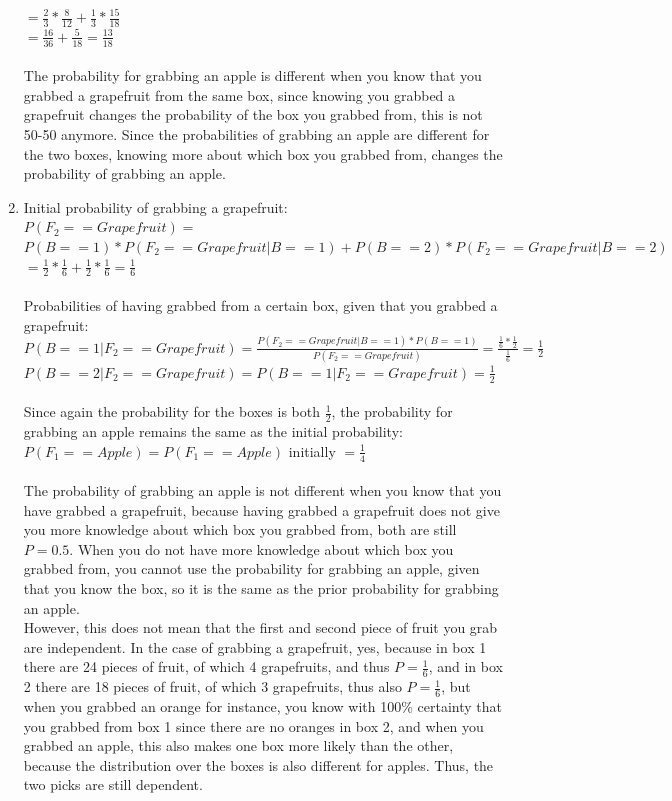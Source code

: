 \documentclass[a4paper,11pt]{article}
\theoremstyle{mytheor}
\begin{document}
\begin{enumerate}
$= \frac{2}{3} * \frac{8}{12} + \frac{1}{3} * \frac{15}{18}$ \\
$= \frac{16}{36} + \frac{5}{18} = \frac{13}{18}$\\
\\
The probability for grabbing an apple is different when you know that you grabbed a grapefruit from the same box, since knowing you grabbed a grapefruit changes the probability of the box you grabbed from, this is not 50-50 anymore. Since the probabilities of grabbing an apple are different for the two boxes, knowing more about which box you grabbed from, changes the probability of grabbing an apple.

\item Initial probability of grabbing a grapefruit:\\
$P(F_2 == Grapefruit) = $\\
$P(B == 1) * P(F_2 == Grapefruit | B == 1) + P(B == 2) * P(F_2 == Grapefruit | B == 2)$ \\
$= \frac{1}{2} * \frac{1}{6} + \frac{1}{2} * \frac{1}{6} = \frac{1}{6}$\\
\\
Probabilities of having grabbed from a certain box, given that you grabbed a grapefruit:\\
$P(B == 1 | F_2 == Grapefruit) = \frac{P(F_2 == Grapefruit | B == 1) * P(B == 1)}{P(F_2 == Grapefruit)} = \frac{\frac{1}{6} * \frac{1}{2}}{\frac{1}{6}} = \frac{1}{2}$\\
$P(B == 2 | F_2 == Grapefruit) = P(B == 1 | F_2 == Grapefruit) = \frac{1}{2}$\\
\\
Since again the probability for the boxes is both $\frac{1}{2}$, the probability for grabbing an apple remains the same as the initial probability:\\
$P(F_1 == Apple) = P(F_1 == Apple)$ initially $= \frac{1}{4}$\\
\\
The probability of grabbing an apple is not different when you know that you have grabbed a grapefruit, because having grabbed a grapefruit does not give you more knowledge about which box you grabbed from, both are still $P = 0.5$. When you do not have more knowledge about which box you grabbed from, you cannot use the probability for grabbing an apple, given that you know the box, so it is the same as the prior probability for grabbing an apple.\\
However, this does not mean that the first and second piece of fruit you grab are independent. In the case of grabbing a grapefruit, yes, because in box 1 there are 24 pieces of fruit, of which 4 grapefruits, and thus $P = \frac{1}{6}$, and in box 2 there are 18 pieces of fruit, of which 3 grapefruits, thus also  $P = \frac{1}{6}$, but when you grabbed an orange for instance, you know with 100\% certainty that you grabbed from box 1 since there are no oranges in box 2, and when you grabbed an apple, this also makes one box more likely than the other, because the distribution over the boxes is also different for apples. Thus, the two picks are still dependent.
\end{enumerate}
\end{document}
